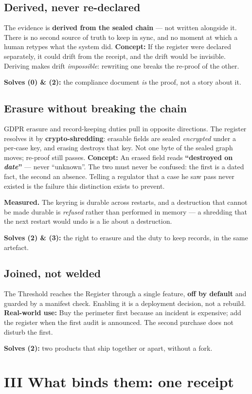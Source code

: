\documentclass[11pt]{article}
\newcommand{\mesure}[1]{{\color{efeteal}\textbf{Measured.} }#1\par}
\newcommand{\concept}[1]{{\color{efenavy}\textbf{Concept:} }#1\par}
\newcommand{\utilite}[1]{{\color{efeplum}\textbf{Real-world use:} }#1\par}
\newcommand{\solves}[2]{{\color{efesolve}\textbf{Solves #1:} }#2\par}
\begin{document}
\subsection{Derived, never re-declared}
The evidence is \textbf{derived from the sealed chain} --- not written alongside it. There is no
second source of truth to keep in sync, and no moment at which a human retypes what the system did.
\concept{If the register were declared separately, it could drift from the receipt, and the drift
would be invisible. Deriving makes drift \emph{impossible}: rewriting one breaks the re-proof of the
other.}
\solves{(0) \& (2)}{the compliance document \emph{is} the proof, not a story about it.}

\subsection{Erasure without breaking the chain}
GDPR erasure and record-keeping duties pull in opposite directions. The register resolves it by
\textbf{crypto-shredding}: erasable fields are sealed \emph{encrypted} under a per-case key, and
erasing destroys that key. Not one byte of the sealed graph moves; re-proof still passes.
\concept{An erased field reads \textbf{``destroyed on \emph{date}''} --- never ``unknown''. The two
must never be confused: the first is a dated fact, the second an absence. Telling a regulator that a
case he saw pass never existed is the failure this distinction exists to prevent.}
\mesure{The keyring is durable across restarts, and a destruction that cannot be made durable is
\emph{refused} rather than performed in memory --- a shredding that the next restart would undo is a
lie about a destruction.}
\solves{(2) \& (3)}{the right to erasure and the duty to keep records, in the same artefact.}

\subsection{Joined, not welded}
The Threshold reaches the Register through a single feature, \textbf{off by default} and guarded by
a manifest check. Enabling it is a deployment decision, not a rebuild.
\utilite{Buy the perimeter first because an incident is expensive; add the register when the first
audit is announced. The second purchase does not disturb the first.}
\solves{(2)}{two products that ship together or apart, without a fork.}

\section{III \;\textbar\; What binds them: one receipt}
\end{document}
